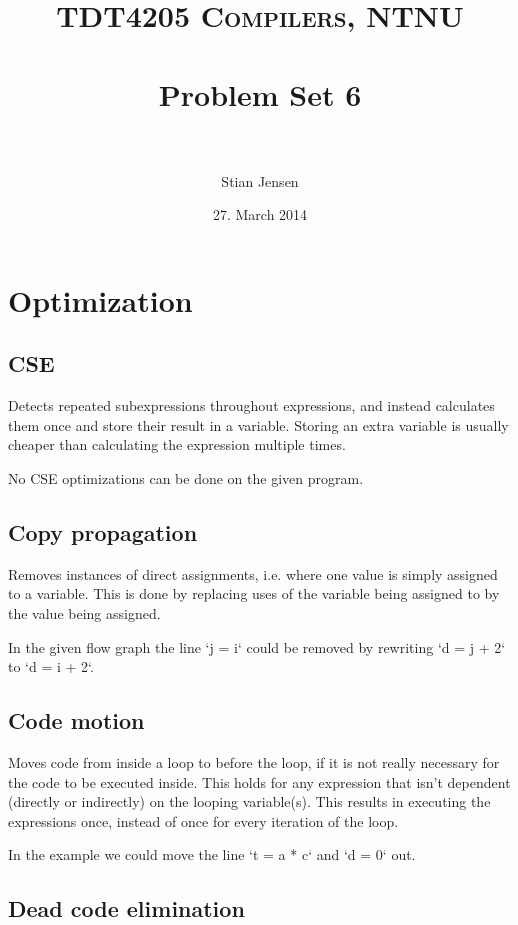 \documentclass[paper=a4, fontsize=11pt]{scrartcl} %
\title{
\normalfont \normalsize
\textsc{TDT4205 Compilers, NTNU} \\ [25pt] %
\horrule{0.5pt} \\[0.4cm] %
\huge Problem Set 6 \\ %
\horrule{2pt} \\[0.5cm] %
}
\author{Stian Jensen} %
\date{\normalsize 27. March 2014} %
\numberwithin{equation}{section} %
\numberwithin{figure}{section} %
\numberwithin{table}{section} %
\begin{document}
\maketitle %


\section{Optimization}

\subsection{CSE}

Detects repeated subexpressions throughout expressions, and instead calculates them once and store their result in a variable. Storing an extra variable is usually cheaper than calculating the expression multiple times.

No CSE optimizations can be done on the given program.

\subsection{Copy propagation}

Removes instances of direct assignments, i.e. where one value is simply assigned to a variable.
This is done by replacing uses of the variable being assigned to by the value being assigned.

In the given flow graph the line `j = i` could be removed by rewriting `d = j + 2` to `d = i + 2`.

\subsection{Code motion}

Moves code from inside a loop to before the loop, if it is not really necessary for the code to be executed inside. This holds for any expression that isn't dependent (directly or indirectly) on the looping variable(s).
This results in executing the expressions once, instead of once for every iteration of the loop.

In the example we could move the line `t = a * c` and `d = 0` out.

\subsection{Dead code elimination}
\end{document}
